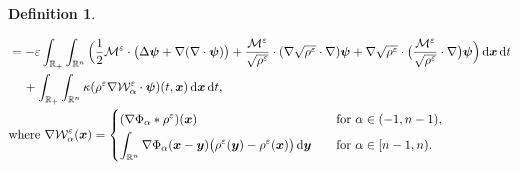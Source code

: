 \documentclass[reqno,11pt]{amsart}
\numberwithin{equation}{section}
\theoremstyle{definition}
\newtheorem{definition}[theorem]{Definition}
\def\v{\varepsilon}
\def\dd{{\, \rm d}}
\def\M{{\mathcal{M}}}
\begin{document}
\begin{definition}
\begin{enumerate}
\begin{align*}
\begin{split}
 & = - \v \int_{\mathbb{R}_+} \int_{\mathbb{R}^n}
  \Big( \frac{1}{2} \M^\v \cdot \big( \Delta \boldsymbol{\psi} + \nabla (\nabla \cdot \boldsymbol{\psi} ) \big)
  + \frac{\M^\v}{\sqrt{\rho^\v}} \cdot (\nabla \sqrt{\rho^\v} \cdot \nabla) \boldsymbol{\psi} + \nabla \sqrt{\rho^\v} \cdot \big( \frac{\M^\v}{\sqrt{\rho^\v}} \cdot \nabla \big) \boldsymbol{\psi} \Big) \dd \boldsymbol{x} \dd t \\
 & \quad\, + \int_{\mathbb{R}_+} \int_{\mathbb{R}^n} \kappa(\rho^\v \nabla \mathcal{W}^\v_\alpha \cdot \boldsymbol{\psi})(t,\boldsymbol{x}) \dd \boldsymbol{x} \dd t,\\
 & \text{where }
 \nabla \mathcal{W}^\v_\alpha(\boldsymbol{x}) =
 \begin{cases}
 \displaystyle
     (\nabla \Phi_\alpha * \rho^\v) (\boldsymbol{x}) & \text{for } \alpha \in (-1,n-1), \\[1mm]
     \displaystyle
     \int_{\mathbb{R}^n} \nabla \Phi_\alpha(\boldsymbol{x} - \boldsymbol{y}) \big(\rho^\v(\boldsymbol{y}) - \rho^\v(\boldsymbol{x})\big) \dd \boldsymbol{y}
     \quad& \text{for } \alpha \in [n-1,n).
 \end{cases}
 \end{split}
    \end{align*}
      \end{enumerate}
\end{definition}
\end{document}
